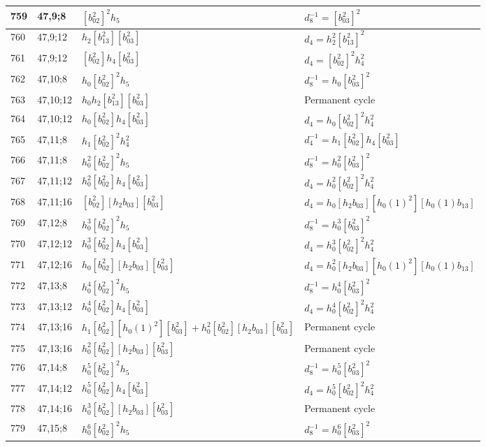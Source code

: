 \documentclass{article}
\begin{document}
\begin{longtable}{|l|l|>{\raggedright\arraybackslash}p{6cm}|>{\raggedright\arraybackslash}p{6cm}|}
\hline
759 & 47,9;8 & $[b_{02}^2]^2h_5$ & $d_{8}^{-1}=[b_{03}^2]^2$\\
\hline
760 & 47,9;12 & $h_2[b_{13}^2][b_{03}^2]$ &$d_{4}=h_2^2[b_{13}^2]^2$\\
761 & 47,9;12 & $[b_{02}^2]h_4[b_{03}^2]$ &$d_{4}=[b_{02}^2]^2h_4^2$\\
\hline
762 & 47,10;8 & $h_0[b_{02}^2]^2h_5$ & $d_{8}^{-1}=h_0[b_{03}^2]^2$\\
\hline
763 & 47,10;12 & $h_0h_2[b_{13}^2][b_{03}^2]$ & Permanent cycle\\
764 & 47,10;12 & $h_0[b_{02}^2]h_4[b_{03}^2]$ &$d_{4}=h_0[b_{02}^2]^2h_4^2$\\
\hline
765 & 47,11;8 & $h_1[b_{02}^2]^2h_4^2$ & $d_{4}^{-1}=h_1[b_{02}^2]h_4[b_{03}^2]$\\
766 & 47,11;8 & $h_0^2[b_{02}^2]^2h_5$ & $d_{8}^{-1}=h_0^2[b_{03}^2]^2$\\
\hline
767 & 47,11;12 & $h_0^2[b_{02}^2]h_4[b_{03}^2]$ &$d_{4}=h_0^2[b_{02}^2]^2h_4^2$\\
\hline
768 & 47,11;16 & $[b_{02}^2][h_2b_{03}][b_{03}^2]$ &$d_{4}=h_0[h_2b_{03}][h_0(1)^2][h_0(1)b_{13}]$\\
\hline
769 & 47,12;8 & $h_0^3[b_{02}^2]^2h_5$ & $d_{8}^{-1}=h_0^3[b_{03}^2]^2$\\
\hline
770 & 47,12;12 & $h_0^3[b_{02}^2]h_4[b_{03}^2]$ &$d_{4}=h_0^3[b_{02}^2]^2h_4^2$\\
\hline
771 & 47,12;16 & $h_0[b_{02}^2][h_2b_{03}][b_{03}^2]$ &$d_{4}=h_0^2[h_2b_{03}][h_0(1)^2][h_0(1)b_{13}]$\\
\hline
772 & 47,13;8 & $h_0^4[b_{02}^2]^2h_5$ & $d_{8}^{-1}=h_0^4[b_{03}^2]^2$\\
\hline
773 & 47,13;12 & $h_0^4[b_{02}^2]h_4[b_{03}^2]$ &$d_{4}=h_0^4[b_{02}^2]^2h_4^2$\\
\hline
774 & 47,13;16 & $h_1[b_{02}^2][h_0(1)^2][b_{03}^2] + h_0^2[b_{02}^2][h_2b_{03}][b_{03}^2]$ & Permanent cycle\\
775 & 47,13;16 & $h_0^2[b_{02}^2][h_2b_{03}][b_{03}^2]$ & Permanent cycle\\
\hline
776 & 47,14;8 & $h_0^5[b_{02}^2]^2h_5$ & $d_{8}^{-1}=h_0^5[b_{03}^2]^2$\\
\hline
777 & 47,14;12 & $h_0^5[b_{02}^2]h_4[b_{03}^2]$ &$d_{4}=h_0^5[b_{02}^2]^2h_4^2$\\
\hline
778 & 47,14;16 & $h_0^3[b_{02}^2][h_2b_{03}][b_{03}^2]$ & Permanent cycle\\
\hline
779 & 47,15;8 & $h_0^6[b_{02}^2]^2h_5$ & $d_{8}^{-1}=h_0^6[b_{03}^2]^2$\\

\end{longtable}
\end{document}
